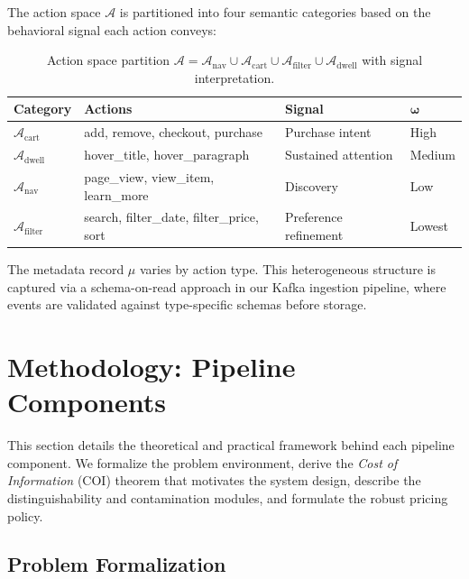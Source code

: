 \documentclass[sigconf]{acmart}
\begin{document}
The action space $\mathcal{A}$ is partitioned into four semantic categories based on the behavioral signal each action conveys:

\begin{table}[t]
\centering
\small
\caption{Action space partition $\mathcal{A} = \mathcal{A}_{\text{nav}} \cup \mathcal{A}_{\text{cart}} \cup \mathcal{A}_{\text{filter}} \cup \mathcal{A}_{\text{dwell}}$ with signal interpretation.}
\label{tab:action_space}
\begin{tabular}{@{}llll@{}}
\toprule
\textbf{Category} & \textbf{Actions} & \textbf{Signal} & $\boldsymbol{\omega}$ \\
\midrule
$\mathcal{A}_{\text{cart}}$ & add, remove, checkout, purchase & Purchase intent & High \\
$\mathcal{A}_{\text{dwell}}$ & hover\_title, hover\_paragraph & Sustained attention & Medium \\
$\mathcal{A}_{\text{nav}}$ & page\_view, view\_item, learn\_more & Discovery & Low \\
$\mathcal{A}_{\text{filter}}$ & search, filter\_date, filter\_price, sort & Preference refinement & Lowest \\
\bottomrule
\end{tabular}
\end{table}

The metadata record $\mu$ varies by action type. This heterogeneous structure is captured via a schema-on-read approach in our Kafka ingestion pipeline, where events are validated against type-specific schemas before storage.


\section{Methodology: Pipeline Components}

This section details the theoretical and practical framework behind each pipeline component. We formalize the problem environment, derive the \textit{Cost of Information} (COI) theorem that motivates the system design, describe the distinguishability and contamination modules, and formulate the robust pricing policy.

\subsection{Problem Formalization}
\end{document}
